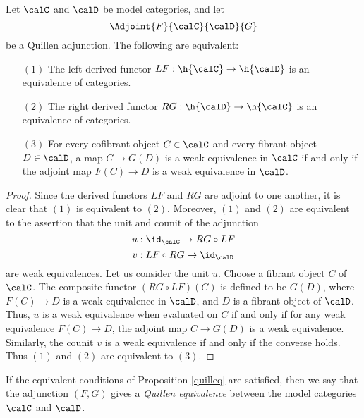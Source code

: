 \begin{proposition}\label{quilleq}
Let $\calC$ and $\calD$ be model categories, and let
$$ \Adjoint{F}{\calC}{\calD}{G} $$
be a Quillen adjunction. The following
are equivalent:
\begin{itemize}
\item[$(1)$] The left derived functor $LF: \h{\calC} \rightarrow \h{\calD}$ is an equivalence of categories.
\item[$(2)$] The right derived functor $RG: \h{\calD} \rightarrow \h{\calC}$ is an equivalence of categories.
\item[$(3)$] For every cofibrant object $C \in \calC$ and every fibrant object $D \in \calD$, a map
$C \rightarrow G(D)$ is a weak equivalence in $\calC$ if and only if the adjoint map $F(C) \rightarrow D$ is a weak equivalence in $\calD$.
\end{itemize}
\end{proposition}

\begin{proof}
Since the derived functors $LF$ and $RG$ are adjoint to one another, it is clear that $(1)$ is equivalent to $(2)$. Moreover, $(1)$ and $(2)$ are equivalent to the assertion that the unit and counit of the adjunction
$$ u: \id_{\calC} \rightarrow RG \circ LF$$
$$ v: LF \circ RG \rightarrow \id_{\calD}$$
are weak equivalences. Let us consider the unit $u$. Choose a fibrant object $C$ of $\calC$.
The composite functor $(RG \circ LF)(C)$ is defined to be $G(D)$, where $F(C) \rightarrow D$ is a weak equivalence in $\calD$, and $D$ is a fibrant object of $\calD$. Thus, $u$ is a weak equivalence when evaluated on $C$ if and only if for any weak equivalence
$F(C) \rightarrow D$, the adjoint map $C \rightarrow G(D)$ is a weak equivalence. Similarly,
the counit $v$ is a weak equivalence if and only if the converse holds. Thus $(1)$ and $(2)$ are equivalent to $(3)$.
\end{proof}

If the equivalent conditions of Proposition \ref{quilleq} are satisfied, then we say that the adjunction $(F,G)$ gives a {\it Quillen equivalence} between the model categories $\calC$ and $\calD$.



